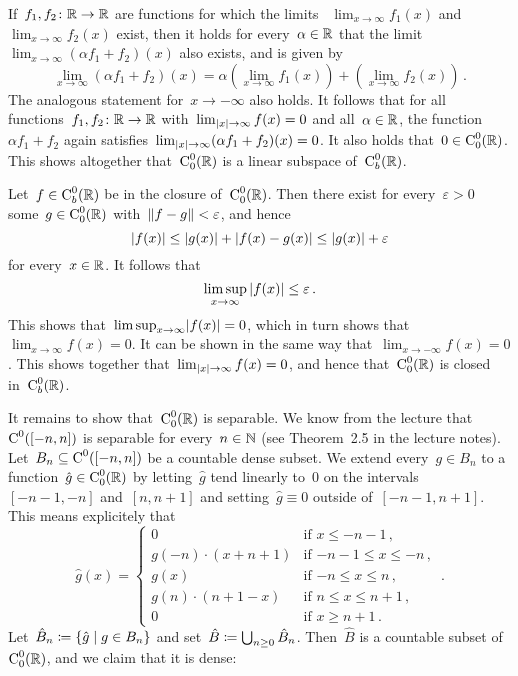 If~$f_1, f_2 \colon \mathbb{R} \to \mathbb{R}$ are functions for which the limits
~$\lim_{x \to \infty} f_1(x)$ and~$\lim_{x \to \infty} f_2(x)$ exist, then it holds for every~$\alpha \in \mathbb{R}$ that the limit~$\lim_{x \to \infty} (\alpha f_1 + f_2)(x)$ also exists, and is given by
\[
    \lim_{x \to \infty} (\alpha f_1 + f_2)(x)
  =   \alpha \left( \lim_{x \to \infty} f_1(x) \right)
    + \left( \lim_{x \to \infty} f_2(x) \right) \,.
\]
The analogous statement for~$x \to -\infty$ also holds.
It follows that for all functions~$f_1, f_2 \colon \mathbb{R} \to \mathbb{R}$ with~$\lim_{\lvert x\rvert \to \infty} f(x) = 0$ and all~$\alpha \in \mathbb{R}$, the function~$\alpha f_1 + f_2$ again satisfies~$\lim_{\lvert x\rvert \to \infty} (\alpha f_1 + f_2)(x) = 0$.
It also holds that~$0 \in \operatorname{C}^0_0(\mathbb{R})$.
This shows altogether that~$\operatorname{C}^0_0(\mathbb{R})$ is a linear subspace of~$\operatorname{C}^0_b(\mathbb{R})$.

Let~$f \in \operatorname{C}^0_b(\mathbb{R})$ be in the closure of~$\operatorname{C}^0_0(\mathbb{R})$.
Then there exist for every~$\varepsilon > 0$ some~$g \in \operatorname{C}^0_0(\mathbb{R})$ with~$\lVert f-g\rVert < \varepsilon$, and hence
\[
        \lvert f(x)\rvert
  \leq  \lvert g(x)\rvert + \lvert f(x) - g(x) \rvert
  \leq  \lvert g(x) \rvert + \varepsilon
\]
for every~$x \in \mathbb{R}$.
It follows that
\[
        \limsup_{x \to \infty} {\lvert f(x)\rvert}
  \leq  \varepsilon \,.
\]
This shows that~$\limsup_{x \to \infty} \lvert f(x) \rvert = 0$, which in turn shows that~$\lim_{x \to \infty} f(x) = 0$.
It can be shown in the same way that~$\lim_{x \to -\infty} f(x) = 0$.
This shows together that~$\lim_{\lvert x\rvert \to \infty} f(x) = 0$, and hence that~$\operatorname{C}^0_0(\mathbb{R})$ is closed in~$\operatorname{C}^0_b(\mathbb{R})$.

It remains to show that~$\operatorname{C}^0_0(\mathbb{R})$ is separable.
We know from the lecture that~$\operatorname{C}^0([-n,n])$ is separable for every~$n \in \mathbb{N}$ (see Theorem~2.5 in the lecture notes).
Let~$B_n \subseteq \operatorname{C}^0([-n,n])$ be a countable dense subset.
We extend every~$g \in B_n$ to a function~$\hat{g} \in \operatorname{C}^0_0(\mathbb{R})$ by letting~$\hat{g}$ tend linearly to~$0$ on the intervals~$[-n-1,-n]$ and~$[n,n+1]$ and setting~$\hat{g} \equiv 0$ outside of~$[-n-1,n+1]$.
This means explicitely that
\[
    \hat{g}(x)
  = \begin{cases}
      0                   & \text{if~$x \leq -n-1$} \,, \\
      g(-n) \cdot (x+n+1) & \text{if~$-n-1 \leq x \leq -n$} \,, \\
      g(x)                & \text{if~$-n \leq x \leq n$}  \,, \\
      g(n) \cdot  (n+1-x) & \text{if~$n \leq x \leq n+1$} \,, \\
      0                   & \text{if~$x \geq n+1$} \,.
    \end{cases} \,.
\]
Let~$\hat{B}_n \defined \{ \hat{g} \suchthat g \in B_n \}$ and set~$\hat{B} \coloneqq \bigcup_{n \geq 0} \hat{B}_n$.
Then~$\hat{B}$ is a countable subset of~$\operatorname{C}^0_0(\mathbb{R})$, and we claim that it is dense:

